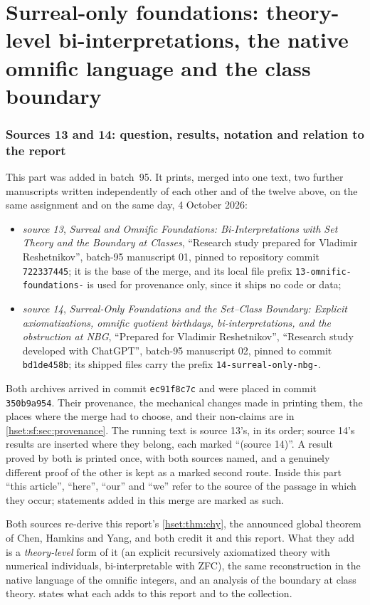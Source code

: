 \documentclass[11pt,letterpaper]{article}
\theoremstyle{definition}
\theoremstyle{remark}
\begin{document}
\part{Surreal-only foundations: theory-level bi-interpretations, the native omnific language and the class boundary}\label{hset:sf:part}

\section{Sources 13 and 14: question, results, notation and relation to the report}
\label{hset:sf:sec:intro}

This part was added in batch~95. It prints, merged into one text, two further
manuscripts written independently of each other and of the twelve above, on
the same assignment and on the same day, 4 October 2026:
\begin{itemize}
\item \emph{source 13}, \emph{Surreal and Omnific Foundations: Bi-Interpretations
with Set Theory and the Boundary at Classes}, ``Research study prepared for
Vladimir Reshetnikov'', batch-95 manuscript 01, pinned to repository commit
\texttt{722337445}; it is the base of the merge, and its local file prefix
\texttt{13-omnific-foundations-} is used for provenance only, since it ships no
code or data;
\item \emph{source 14}, \emph{Surreal-Only Foundations and the Set--Class
Boundary: Explicit axiomatizations, omnific quotient birthdays,
bi-interpretations, and the obstruction at NBG}, ``Prepared for Vladimir
Reshetnikov'', ``Research study developed with ChatGPT'', batch-95 manuscript 02,
pinned to commit \texttt{bd1de458b}; its shipped files carry the prefix
\texttt{14-surreal-only-nbg-}.
\end{itemize}
Both archives arrived in commit \texttt{ec91f8c7c} and were placed in commit
\texttt{350b9a954}. Their provenance, the mechanical changes made in printing
them, the places where the merge had to choose, and their non-claims are in
\cref{hset:sf:sec:provenance}. The running text is source 13's, in its order;
source 14's results are inserted where they belong, each marked ``(source 14)''.
A result proved by both is printed once, with both sources named, and a
genuinely different proof of the other is kept as a marked second route. Inside
this part ``this article'', ``here'', ``our'' and ``we'' refer to the source of
the passage in which they occur; statements added in this merge are marked as
such.

Both sources re-derive this report's \cref{hset:thm:chy}, the announced global
theorem of Chen, Hamkins and Yang, and both credit it and this report. What they
add is a \emph{theory-level} form of it (an explicit recursively axiomatized
theory with numerical individuals, bi-interpretable with ZFC), the same
reconstruction in the native language of the omnific integers, and an analysis
of the boundary at class theory.  states what each
adds to this report and to the collection.
\end{document}
